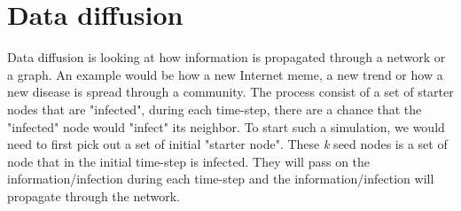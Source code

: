\section{Data diffusion}
Data diffusion is looking at how information is propagated through a network or a graph. An example would be how a new Internet meme, a new trend or how a new disease is spread through a community. The process consist of a set of starter nodes that are "infected", during each time-step, there are a chance that the "infected" node would "infect" its neighbor. To start such a simulation, we would need to first pick out a set of initial "starter node". These {\it k} seed nodes is a set of node that in the initial time-step is infected. They will pass on the information/infection during each time-step and the information/infection will propagate through the network.

